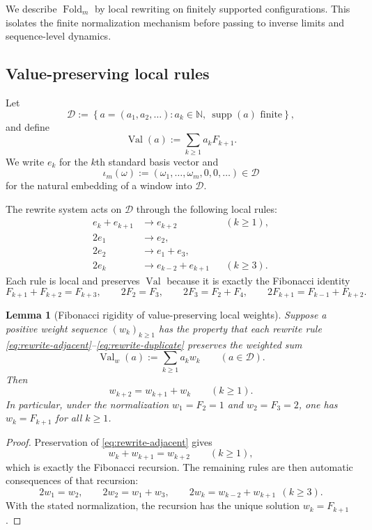 \documentclass[11pt,letterpaper]{article}
\numberwithin{equation}{section}
\theoremstyle{plain}
\newtheorem{lemma}[theorem]{Lemma}
\theoremstyle{definition}
\theoremstyle{remark}
\newcommand{\NN}{\mathbb{N}}
\DeclareMathOperator{\supp}{supp}
\DeclareMathOperator{\Val}{Val}
\DeclareMathOperator{\Fold}{Fold}
\begin{document}
We describe $\Fold_m$ by local rewriting on finitely supported configurations.
This isolates the finite normalization mechanism before passing to inverse
limits and sequence-level dynamics.

\subsection{Value-preserving local rules}

Let
\[
\mathcal D
:=
\left\{
a=(a_1,a_2,\ldots):
a_k\in\NN,\ \supp(a)\text{ finite}
\right\},
\]
and define
\[
\Val(a):=\sum_{k\ge 1} a_kF_{k+1}.
\]
We write $e_k$ for the $k$th standard basis vector and
\[
\iota_m(\omega):=(\omega_1,\ldots,\omega_m,0,0,\ldots)\in\mathcal D
\]
for the natural embedding of a window into $\mathcal D$.

The rewrite system acts on $\mathcal D$ through the following local rules:
\begin{align}
e_k+e_{k+1}&\longrightarrow e_{k+2} && (k\ge 1), \label{eq:rewrite-adjacent}\\
2e_1&\longrightarrow e_2, \label{eq:rewrite-base1}\\
2e_2&\longrightarrow e_1+e_3, \label{eq:rewrite-base2}\\
2e_k&\longrightarrow e_{k-2}+e_{k+1} && (k\ge 3). \label{eq:rewrite-duplicate}
\end{align}
Each rule is local and preserves $\Val$ because it is exactly the Fibonacci
identity
\[
F_{k+1}+F_{k+2}=F_{k+3},
\qquad
2F_2=F_3,
\qquad
2F_3=F_2+F_4,
\qquad
2F_{k+1}=F_{k-1}+F_{k+2}.
\]

\begin{lemma}[Fibonacci rigidity of value-preserving local weights]
\label{lem:fold-local-weight-rigidity-fibonacci}
Suppose a positive weight sequence $(w_k)_{k\ge 1}$ has the property that each
rewrite rule \eqref{eq:rewrite-adjacent}--\eqref{eq:rewrite-duplicate}
preserves the weighted sum
\[
\Val_w(a):=\sum_{k\ge 1} a_kw_k
\qquad (a\in\mathcal D).
\]
Then
\[
w_{k+2}=w_{k+1}+w_k
\qquad (k\ge 1).
\]
In particular, under the normalization $w_1=F_2=1$ and $w_2=F_3=2$, one has
$w_k=F_{k+1}$ for all $k\ge 1$.
\end{lemma}

\begin{proof}
Preservation of \eqref{eq:rewrite-adjacent} gives
\[
w_k+w_{k+1}=w_{k+2}
\qquad (k\ge 1),
\]
which is exactly the Fibonacci recursion.  The remaining rules are then
automatic consequences of that recursion:
\[
2w_1=w_2,\qquad 2w_2=w_1+w_3,\qquad 2w_k=w_{k-2}+w_{k+1}\ \ (k\ge 3).
\]
With the stated normalization, the recursion has the unique solution
$w_k=F_{k+1}$.
\end{proof}
\end{document}
